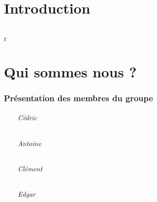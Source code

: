 \documentclass[titlepage, 13px, a4paper]{report}
\begin{document}
\AddToShipoutPicture*{\BackgroundPic}

\maketitle
\tableofcontents


\part{Introduction} 
\paragraph{} \hspace{0pt}
r



\newpage


\part{Qui sommes nous ?}
\section{Présentation des membres du groupe}

\paragraph{~~~~Cédric} \hspace{0pt}

\paragraph{~~~~Antoine} \hspace{0pt}

\paragraph{~~~~Clément} \hspace{0pt}

\paragraph{~~~~Edgar} \hspace{0pt}
\end{document}
